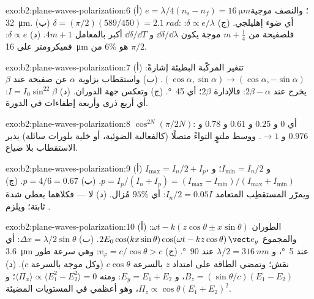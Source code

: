 \begin{solution}{exo:b2:plane-waves-polarization:6}
(أ) $e = \lambda/4(n_s - n_f) = \qty{16}{\micro m}$؛ والنصف موجية \qty{32}{\micro m}. (ب) $\delta =
(\pi/2)(589/450) = \qty{2.1}{rad}$: أي ضوء إهليلجي. (ج) $\delta \propto e/\lambda$: فلصفيحة
من $m + \tfrac14$ موجة يكون $\dd\delta/\dd\lambda$ و $\dd\delta/\dd T$ أكبر بالمعامل
$4m + 1$. (د) $\delta \propto e$: فميكرومتر على \qty{16}{\micro m} هو $6\%$ من $\pi/2$.
\end{solution}

\begin{solution}{exo:b2:plane-waves-polarization:7}
(أ) تتغير المركّبة البطيئة إشارةً: $(\cos\alpha, \sin\alpha) \to (\cos\alpha,
-\sin\alpha)$. (ب) واستقطاب بزاوية $\alpha$ عن صفيحة عند $\beta$ يخرج
عند $2\beta - \alpha$: فالإدارة $2\beta$؛ أي \qty{45}{\degree}. (ج) وتعكس
جهة الدوران. (د) $I = I_0\sin^22\beta$: أي أربع ذرى وأربعة إطفاءات
في الدورة.
\end{solution}

\begin{solution}{exo:b2:plane-waves-polarization:8}
$\cos^{2N}(\pi/2N)$: أي $0$ و $0.25$ و $0.61$ و $0.78$ و $0.976$ و $\to 1$. ووسط
ملتوٍ التواءً متصلًا (كالفعالية الضوئية، أو خلية بلورات سائلة)
يدير الاستقطاب بلا ضياع.
\end{solution}

\begin{solution}{exo:b2:plane-waves-polarization:9}
(أ) $I_{\max} = I_n/2 + I_p$، و $I_{\min} = I_n/2$؛ و $p = I_p/(I_n + I_p) = (I_{\max} -
I_{\min})/(I_{\max} + I_{\min})$. (ب) $p = 4/6 = 0.67$. (ج) ويمرّر المستقطِب المتعامد
$I_n/2 = 0.05I$: أي $95\%$ مُزال. (د) لا --- فكلاهما يعطي شدة
ثابتة؛ ويلزم .
\end{solution}

\begin{solution}{exo:b2:plane-waves-polarization:10}
(أ) الطوران $\omega t - k(z\cos\theta \pm x\sin\theta)$: والمجموع $2E_0\cos(kx\sin\theta)\cos(\omega t
- kz\cos\theta)\,\vect e_y$. (ب) $\Delta x = \lambda/2\sin\theta$: أي \qty{3.6}{\micro m} عند \qty{5}{\degree}،
و $\lambda/2 = \qty{316}{nm}$ عند \qty{90}{\degree}. (ج) $v_\varphi = c/\cos\theta > c$: وهي سرعة طور
نقش؛ وتمضي الطاقة على امتداد $z$ بالسرعة $c\cos\theta$ (وكل موجة بالسرعة $c$).
(د) $B_z = (\sin\theta/c)(E_1 - E_2)$، و $E_y = E_1 + E_2$: ومنه $\langle\Pi_x\rangle \propto
\langle E_1^2 - E_2^2\rangle = 0$؛ و $\Pi_z \propto \cos\theta(E_1 + E_2)^2$، وهو أعظمي في
المستويات المضيئة.
\end{solution}

